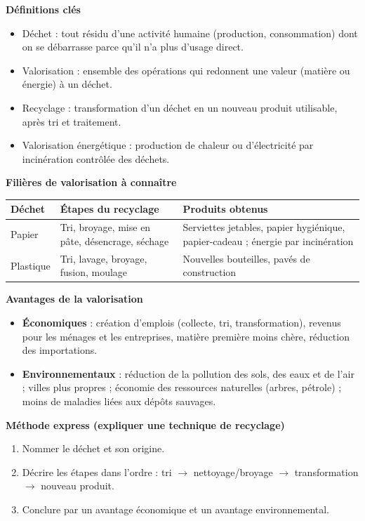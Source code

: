 \documentclass[11pt]{article}
\newcommand{\cle}[1]{{\popxbold\color{popdark}#1}}
\begin{document}
\begin{bilan}
\textbf{Définitions clés}
\begin{itemize}
\item \cle{Déchet} : tout résidu d'une activité humaine (production, consommation) dont on se débarrasse parce qu'il n'a plus d'usage direct.
\item \cle{Valorisation} : ensemble des opérations qui redonnent une valeur (matière ou énergie) à un déchet.
\item \cle{Recyclage} : transformation d'un déchet en un nouveau produit utilisable, après tri et traitement.
\item \cle{Valorisation énergétique} : production de chaleur ou d'électricité par incinération contrôlée des déchets.
\end{itemize}

\textbf{Filières de valorisation à connaître}
\begin{center}
\begin{tabularx}{\linewidth}{|l|X|X|}
\hline
\rowcolor{popblueL} \textbf{Déchet} & \textbf{Étapes du recyclage} & \textbf{Produits obtenus} \\
\hline
Papier & Tri, broyage, mise en pâte, désencrage, séchage & Serviettes jetables, papier hygiénique, papier-cadeau ; énergie par incinération \\
\hline
Plastique & Tri, lavage, broyage, fusion, moulage & Nouvelles bouteilles, pavés de construction \\
\hline
\end{tabularx}
\end{center}

\textbf{Avantages de la valorisation}
\begin{itemize}
\item \textbf{Économiques} : création d'emplois (collecte, tri, transformation), revenus pour les ménages et les entreprises, matière première moins chère, réduction des importations.
\item \textbf{Environnementaux} : réduction de la pollution des sols, des eaux et de l'air ; villes plus propres ; économie des ressources naturelles (arbres, pétrole) ; moins de maladies liées aux dépôts sauvages.
\end{itemize}

\textbf{Méthode express (expliquer une technique de recyclage)}
\begin{enumerate}
\item Nommer le déchet et son origine.
\item Décrire les étapes dans l'ordre : tri $\rightarrow$ nettoyage/broyage $\rightarrow$ transformation $\rightarrow$ nouveau produit.
\item Conclure par un avantage économique et un avantage environnemental.
\end{enumerate}
\end{bilan}
\end{document}
